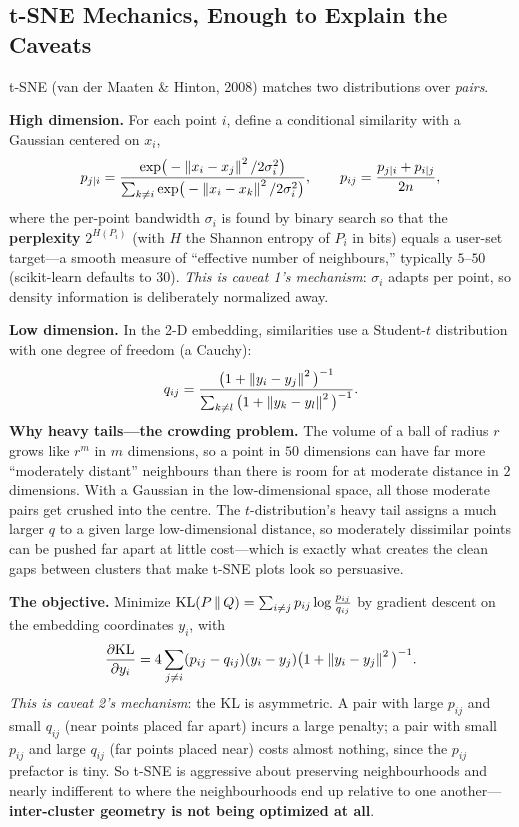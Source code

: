 \subsection{t-SNE Mechanics, Enough to Explain the Caveats}

t-SNE (van der Maaten \& Hinton, 2008) matches two distributions over \emph{pairs}.

\textbf{High dimension.} For each point $i$, define a conditional similarity with a Gaussian centered on $x_i$,
\begin{equation}
p_{j|i} = \frac{\exp\!\big(-\left\lVert x_i - x_j\right\rVert^2 / 2\sigma_i^2\big)}{\sum_{k \ne i} \exp\!\big(-\left\lVert x_i - x_k\right\rVert^2 / 2\sigma_i^2\big)}, \qquad p_{ij} = \frac{p_{j|i} + p_{i|j}}{2n},
\end{equation}
where the per-point bandwidth $\sigma_i$ is found by binary search so that the \textbf{perplexity} $2^{H(P_i)}$ (with $H$ the Shannon entropy of $P_i$ in bits) equals a user-set target---a smooth measure of ``effective number of neighbours,'' typically $5$--$50$ (scikit-learn defaults to $30$). \emph{This is caveat 1's mechanism}: $\sigma_i$ adapts per point, so density information is deliberately normalized away.

\textbf{Low dimension.} In the 2-D embedding, similarities use a Student-$t$ distribution with one degree of freedom (a Cauchy):
\begin{equation}
q_{ij} = \frac{\big(1 + \left\lVert y_i - y_j\right\rVert^2\big)^{-1}}{\sum_{k \ne l} \big(1 + \left\lVert y_k - y_l\right\rVert^2\big)^{-1}} .
\end{equation}
\textbf{Why heavy tails---the crowding problem.} The volume of a ball of radius $r$ grows like $r^m$ in $m$ dimensions, so a point in $50$ dimensions can have far more ``moderately distant'' neighbours than there is room for at moderate distance in $2$ dimensions. With a Gaussian in the low-dimensional space, all those moderate pairs get crushed into the centre. The $t$-distribution's heavy tail assigns a much larger $q$ to a given large low-dimensional distance, so moderately dissimilar points can be pushed far apart at little cost---which is exactly what creates the clean gaps between clusters that make t-SNE plots look so persuasive.

\textbf{The objective.} Minimize $\operatorname{KL}(P \,\|\, Q) = \sum_{i \ne j} p_{ij}\log\frac{p_{ij}}{q_{ij}}$ by gradient descent on the embedding coordinates $y_i$, with
\begin{equation}
\frac{\partial \mathrm{KL}}{\partial y_i} = 4\sum_{j \ne i} (p_{ij} - q_{ij})(y_i - y_j)\big(1 + \left\lVert y_i - y_j\right\rVert^2\big)^{-1} .
\end{equation}
\emph{This is caveat 2's mechanism}: the KL is asymmetric. A pair with large $p_{ij}$ and small $q_{ij}$ (near points placed far apart) incurs a large penalty; a pair with small $p_{ij}$ and large $q_{ij}$ (far points placed near) costs almost nothing, since the $p_{ij}$ prefactor is tiny. So t-SNE is aggressive about preserving neighbourhoods and nearly indifferent to where the neighbourhoods end up relative to one another---\textbf{inter-cluster geometry is not being optimized at all}.

